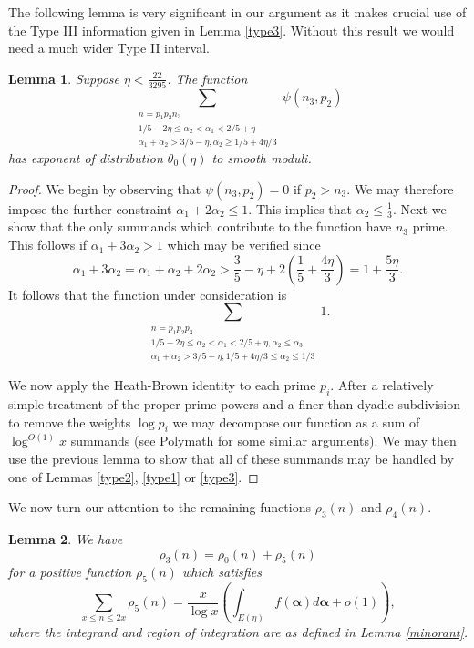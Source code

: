 \documentclass[12pt]{amsart}
\theoremstyle{plain}
\newtheorem{lem}{Lemma}
\theoremstyle{definition}
\newcommand{\bs}{\boldsymbol}
\numberwithin{equation}{section}
\def \a{\alpha} \def \b{\beta} \def \d{\delta} \def \e{\varepsilon} \def \g{\gamma} \def \k{\kappa} \def \l{\lambda} \def \s{\sigma} \def \t{\theta} \def \z{\zeta}
\newcommand{\threesum}[3]{\sum_{\substack{#1\\#2\\#3}}}
\begin{document}
The following lemma is very significant in our argument as it makes crucial use of the Type III information given in Lemma \ref{type3}.  Without this result we would need a much wider Type II interval.

\begin{lem}\label{hblem}
Suppose $\eta<\frac{22}{3295}$.   The function 
$$\threesum{n=p_1p_2n_3}{1/5-2\eta\leq \a_2<\a_1< 2/5+\eta}{\a_1+\a_2> 3/5-\eta,\a_2\geq 1/5+4\eta/3}\psi(n_3,p_2)$$
has exponent of distribution $\theta_0(\eta)$ to smooth moduli.  
\end{lem}

\begin{proof}
We begin by observing that $\psi(n_3,p_2)=0$ if $p_2>n_3$.  We may therefore impose the further constraint 
$\a_1+2\a_2\leq 1$.  This implies that $\a_2\leq \frac13$. Next we show that the only summands which contribute to the function have $n_3$ prime.  This follows if $\a_1+3\a_2>1$ which may be verified since 
$$\a_1+3\a_2=\a_1+\a_2+2\a_2> \frac35-\eta+2(\frac{1}{5}+\frac{4\eta}{3})=1+\frac{5\eta}{3}.$$
It follows that the function under consideration is 
$$\threesum{n=p_1p_2p_3}{1/5-2\eta\leq \a_2<\a_1< 2/5+\eta,\a_2\leq \a_3}{\a_1+\a_2> 3/5-\eta,1/5+4\eta/3\leq \a_2\leq 1/3}1.$$

We now apply the Heath-Brown identity \cite{rhbidentity} to each prime $p_i$.  After a relatively simple treatment of the proper prime powers and a finer than dyadic subdivision to remove the weights $\log p_i$ we may decompose our function as a sum of $\log^{O(1)}x$ summands  (see Polymath \cite[Section 3]{polymath8a} for some similar arguments).  We may then use the previous lemma to show that all of these summands may be handled by one of Lemmas \ref{type2}, \ref{type1} or \ref{type3}.  
\end{proof}

We now turn our attention to the remaining functions $\rho_3(n)$ and $\rho_4(n)$.

\begin{lem}\label{rho3}
We have 
$$\rho_3(n)=\rho_0(n)+\rho_5(n)$$
for a positive function $\rho_5(n)$ which satisfies 
$$\sum_{x\leq n\leq 2x}\rho_5(n)=\frac{x}{\log x}\left(\int_{E(\eta)} f(\bs \a)d\bs \a+o(1)\right),$$
where the integrand and region of integration are as defined in Lemma \ref{minorant}.
\end{lem}
\end{document}
